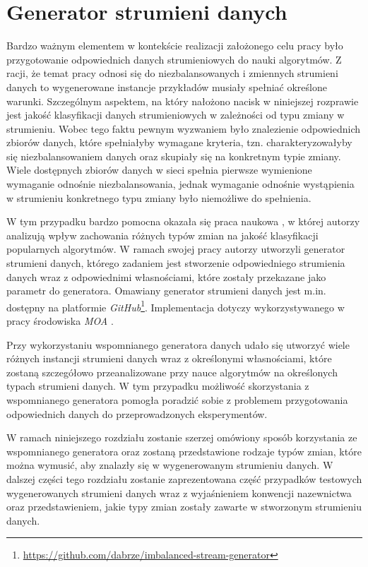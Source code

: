 \chapter{Generator strumieni danych}
\label{Chapter:Generator}

\noindent Bardzo ważnym elementem w kontekście realizacji założonego celu pracy było przygotowanie odpowiednich danych strumieniowych do nauki algorytmów. Z racji, że temat pracy odnosi się do niezbalansowanych i zmiennych strumieni danych to wygenerowane instancje przykładów musiały spełniać określone warunki. Szczególnym aspektem, na który nałożono nacisk w niniejszej rozprawie jest jakość klasyfikacji danych strumieniowych w zależności od typu zmiany w strumieniu. Wobec tego faktu pewnym wyzwaniem było znalezienie odpowiednich zbiorów danych, które spełniałyby wymagane kryteria, tzn. charakteryzowałyby się niezbalansowaniem danych oraz skupiały się na konkretnym typie zmiany. Wiele dostępnych zbiorów danych w sieci spełnia pierwsze wymienione wymaganie odnośnie niezbalansowania, jednak wymaganie odnośnie wystąpienia w strumieniu konkretnego typu zmiany było niemożliwe do spełnienia.

W tym przypadku bardzo pomocna okazała się praca naukowa \cite{Article:TypyPrzykladow}, w której autorzy analizują wpływ zachowania różnych typów zmian na jakość klasyfikacji popularnych algorytmów. W ramach swojej pracy autorzy utworzyli generator strumieni danych, którego zadaniem jest stworzenie odpowiedniego strumienia danych wraz z odpowiednimi własnościami, które zostały przekazane jako parametr do generatora. Omawiany generator strumieni danych jest m.in. dostępny na platformie \textit{GitHub}\footnote{\url{https://github.com/dabrze/imbalanced-stream-generator}}. Implementacja dotyczy wykorzystywanego w pracy środowiska \textit{MOA} \cite{Article:MOA}.

Przy wykorzystaniu wspomnianego generatora danych udało się utworzyć wiele różnych instancji strumieni danych wraz z określonymi własnościami, które zostaną szczegółowo przeanalizowane przy nauce algorytmów na określonych typach strumieni danych. W tym przypadku możliwość skorzystania z wspomnianego generatora pomogła poradzić sobie z problemem przygotowania odpowiednich danych do przeprowadzonych eksperymentów.

W ramach niniejszego rozdziału zostanie szerzej omówiony sposób korzystania ze wspomnianego generatora oraz zostaną przedstawione rodzaje typów zmian, które można wymusić, aby znalazły się w wygenerowanym strumieniu danych. W dalszej części tego rozdziału zostanie zaprezentowana część przypadków testowych wygenerowanych strumieni danych wraz z wyjaśnieniem konwencji nazewnictwa oraz przedstawieniem, jakie typy zmian zostały zawarte w stworzonym strumieniu danych.

